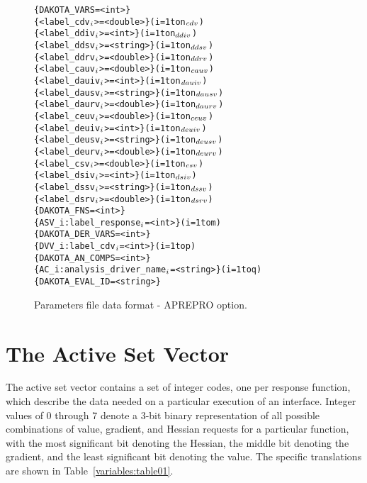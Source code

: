 \begin{figure}
  \begin{bigbox}
  \centering
  \begin{alltt}
    \{ DAKOTA_VARS = <int> \}
    \{ <label_cdv\(\sb{i}\)> = <double> \}         (i = 1 to n\(\sb{cdv}\))
    \{ <label_ddiv\(\sb{i}\)> = <int> \}           (i = 1 to n\(\sb{ddiv}\))
    \{ <label_ddsv\(\sb{i}\)> = <string> \}        (i = 1 to n\(\sb{ddsv}\))
    \{ <label_ddrv\(\sb{i}\)> = <double> \}        (i = 1 to n\(\sb{ddrv}\))
    \{ <label_cauv\(\sb{i}\)> = <double> \}        (i = 1 to n\(\sb{cauv}\))
    \{ <label_dauiv\(\sb{i}\)> = <int> \}          (i = 1 to n\(\sb{dauiv}\))
    \{ <label_dausv\(\sb{i}\)> = <string> \}       (i = 1 to n\(\sb{dausv}\))
    \{ <label_daurv\(\sb{i}\)> = <double> \}       (i = 1 to n\(\sb{daurv}\))
    \{ <label_ceuv\(\sb{i}\)> = <double> \}        (i = 1 to n\(\sb{ceuv}\))
    \{ <label_deuiv\(\sb{i}\)> = <int> \}          (i = 1 to n\(\sb{deuiv}\))
    \{ <label_deusv\(\sb{i}\)> = <string> \}       (i = 1 to n\(\sb{deusv}\))
    \{ <label_deurv\(\sb{i}\)> = <double> \}       (i = 1 to n\(\sb{deurv}\))
    \{ <label_csv\(\sb{i}\)> = <double> \}         (i = 1 to n\(\sb{csv}\))
    \{ <label_dsiv\(\sb{i}\)> = <int> \}           (i = 1 to n\(\sb{dsiv}\))
    \{ <label_dssv\(\sb{i}\)> = <string> \}        (i = 1 to n\(\sb{dssv}\))
    \{ <label_dsrv\(\sb{i}\)> = <double> \}        (i = 1 to n\(\sb{dsrv}\)) \color{blue}
    \{ DAKOTA_FNS = <int> \}
    \{ ASV_i:label_response\(\sb{i}\) = <int> \}              (i = 1 to m) \color{red}
    \{ DAKOTA_DER_VARS = <int> \}
    \{ DVV_i:label_cdv\(\sb{i}\) = <int> \}                   (i = 1 to p) \color{green}
    \{ DAKOTA_AN_COMPS = <int> \}
    \{ AC_i:analysis_driver_name\(\sb{i}\) = <string> \}      (i = 1 to q)
    \{ DAKOTA_EVAL_ID = <string> \}
  \end{alltt}
  \end{bigbox}
  \caption{Parameters file data format - APREPRO option.}
  \label{variables:figure02}
\end{figure}

\section{The Active Set Vector}\label{variables:asv}

The active set vector contains a set of integer codes, one per
response function, which describe the data needed on a particular
execution of an interface. Integer values of 0 through 7 denote a
3-bit binary representation of all possible combinations of value,
gradient, and Hessian requests for a particular function, with the
most significant bit denoting the Hessian, the middle bit denoting the
gradient, and the least significant bit denoting the value. The
specific translations are shown in Table~\ref{variables:table01}.

